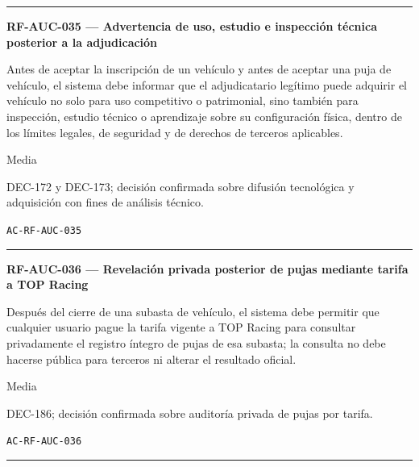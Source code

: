 \documentclass[10pt,letterpaper]{article}
\begin{document}
\vspace{0.25em}\hrule\vspace{0.65em}
\noindent\textbf{RF-AUC-035 --- Advertencia de uso, estudio e inspección técnica posterior a la adjudicación}\par
\begin{description}[style=nextline,leftmargin=3.15cm,labelwidth=2.8cm,font=\normalfont\bfseries]
\item[Obligación] Antes de aceptar la inscripción de un vehículo y antes de aceptar una puja de vehículo, el sistema debe informar que el adjudicatario legítimo puede adquirir el vehículo no solo para uso competitivo o patrimonial, sino también para inspección, estudio técnico o aprendizaje sobre su configuración física, dentro de los límites legales, de seguridad y de derechos de terceros aplicables.
\item[Prioridad] Media
\item[Procedencia] DEC-172 y DEC-173; decisión confirmada sobre difusión tecnológica y adquisición con fines de análisis técnico.
\item[Verificación] \texttt{AC-RF-AUC-035}
\end{description}
\vspace{0.25em}\hrule\vspace{0.65em}
\noindent\textbf{RF-AUC-036 --- Revelación privada posterior de pujas mediante tarifa a TOP Racing}\par
\begin{description}[style=nextline,leftmargin=3.15cm,labelwidth=2.8cm,font=\normalfont\bfseries]
\item[Obligación] Después del cierre de una subasta de vehículo, el sistema debe permitir que cualquier usuario pague la tarifa vigente a TOP Racing para consultar privadamente el registro íntegro de pujas de esa subasta; la consulta no debe hacerse pública para terceros ni alterar el resultado oficial.
\item[Prioridad] Media
\item[Procedencia] DEC-186; decisión confirmada sobre auditoría privada de pujas por tarifa.
\item[Verificación] \texttt{AC-RF-AUC-036}
\end{description}
\vspace{0.25em}\hrule\vspace{0.65em}
\end{document}
